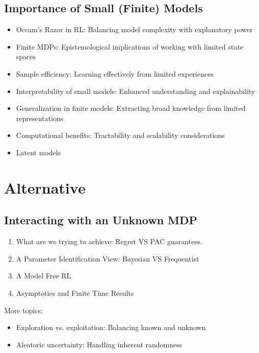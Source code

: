 \section{Importance of Small (Finite) Models}
\begin{itemize}
    \item Occam's Razor in RL: Balancing model complexity with explanatory power
    \item Finite MDPs: Epistemological implications of working with limited state spaces
    \item Sample efficiency: Learning effectively from limited experiences
    \item Interpretability of small models: Enhanced understanding and explainability
    \item Generalization in finite models: Extracting broad knowledge from limited representations
    \item Computational benefits: Tractability and scalability considerations
    \item Latent models
\end{itemize}


\chapter{Alternative}


\section{Interacting with an Unknown MDP}

\begin{enumerate}
    \item 
What are we trying to achieve: Regret VS PAC guarantees.
\item A Parameter Identification View:
Bayesian VS Frequentist 
\item A Model Free RL
\item Asymptotics and Finite Time Results
\end{enumerate}
More topics:

\begin{itemize}
    \item Exploration vs. exploitation: Balancing known and unknown
        \item Aleatoric uncertainty: Handling inherent randomness

\end{itemize}




